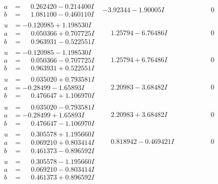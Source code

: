 \documentclass[1p]{elsarticle_modified}
\theoremstyle{definition}
\begin{document}
$$\begin{array}{c|c|c}
\begin{aligned}
a &= \phantom{-}0.262420 - 0.214400 I \\
b &= \phantom{-}1.081100 - 0.460110 I\end{aligned}
 & -3.92344 - 1.90005 I & \phantom{-0.000000 } 0 \\ \hline\begin{aligned}
u &= -0.120985 + 1.198530 I \\
a &= \phantom{-}0.050366 + 0.707725 I \\
b &= \phantom{-}0.963931 - 0.522551 I\end{aligned}
 & \phantom{-}1.25794 - 6.76486 I & \phantom{-0.000000 } 0 \\ \hline\begin{aligned}
u &= -0.120985 - 1.198530 I \\
a &= \phantom{-}0.050366 - 0.707725 I \\
b &= \phantom{-}0.963931 + 0.522551 I\end{aligned}
 & \phantom{-}1.25794 + 6.76486 I & \phantom{-0.000000 } 0 \\ \hline\begin{aligned}
u &= \phantom{-}0.035020 + 0.793581 I \\
a &= -0.28499 - 1.65893 I \\
b &= \phantom{-}0.476647 + 1.106970 I\end{aligned}
 & \phantom{-}2.20983 - 3.68482 I & \phantom{-0.000000 } 0 \\ \hline\begin{aligned}
u &= \phantom{-}0.035020 - 0.793581 I \\
a &= -0.28499 + 1.65893 I \\
b &= \phantom{-}0.476647 - 1.106970 I\end{aligned}
 & \phantom{-}2.20983 + 3.68482 I & \phantom{-0.000000 } 0 \\ \hline\begin{aligned}
u &= \phantom{-}0.305578 + 1.195660 I \\
a &= \phantom{-}0.069210 + 0.803414 I \\
b &= \phantom{-}0.461373 - 0.896592 I\end{aligned}
 & \phantom{-}0.818942 - 0.469421 I & \phantom{-0.000000 } 0 \\ \hline\begin{aligned}
u &= \phantom{-}0.305578 - 1.195660 I \\
a &= \phantom{-}0.069210 - 0.803414 I \\
b &= \phantom{-}0.461373 + 0.896592 I\end{aligned}

\end{array}$$
\end{document}
